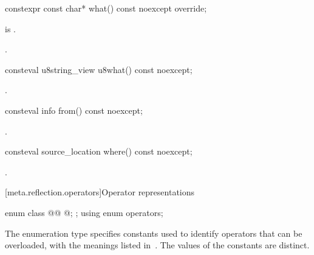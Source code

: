 %
\begin{itemdecl}
constexpr const char* what() const noexcept override;
\end{itemdecl}
\begin{itemdescr}
\pnum
\constantwhen
{} is .

\pnum
\returns
{}.
\end{itemdescr}

%
\begin{itemdecl}
consteval u8string_view u8what() const noexcept;
\end{itemdecl}
\begin{itemdescr}
\pnum
\returns
{}.
\end{itemdescr}

%
\begin{itemdecl}
consteval info from() const noexcept;
\end{itemdecl}
\begin{itemdescr}
\pnum
\returns
{}.
\end{itemdescr}

%
\begin{itemdecl}
consteval source_location where() const noexcept;
\end{itemdecl}
\begin{itemdescr}
\pnum
\returns
{}.
\end{itemdescr}

[meta.reflection.operators]{Operator representations}

\begin{itemdecl}
enum class @@ {
  @\seebelow@;
};
using enum operators;
\end{itemdecl}

\begin{itemdescr}
\pnum
The enumeration type  specifies
constants used to identify operators that can be overloaded,
with the meanings listed in~.
The values of the constants are distinct.
\end{itemdescr}

